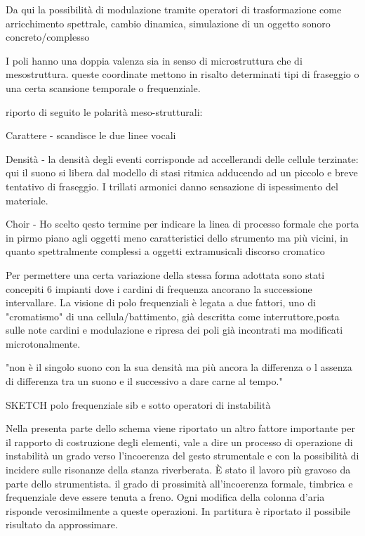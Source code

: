 Da qui la possibilità di modulazione tramite operatori di trasformazione come arricchimento spettrale, cambio dinamica, simulazione di un oggetto sonoro concreto/complesso

I poli hanno una doppia valenza sia in senso di microstruttura che di mesostruttura.
queste coordinate  mettono in risalto determinati tipi di fraseggio o una certa scansione temporale o frequenziale.

riporto di seguito le polarità meso-strutturali:

Carattere - scandisce le due linee vocali

Densità - la densità degli eventi corrisponde ad accellerandi delle cellule terzinate: qui il suono si libera dal modello di stasi ritmica adducendo ad un piccolo e breve tentativo di fraseggio. I trillati armonici danno sensazione di ispessimento del materiale.

Choir - Ho scelto qesto termine per indicare la linea di processo formale che porta in pirmo piano agli oggetti meno caratteristici dello strumento ma più vicini, in quanto spettralmente complessi a oggetti extramusicali
discorso cromatico


Per permettere una certa variazione della stessa forma adottata sono stati concepiti 6 impianti dove i cardini di frequenza ancorano la successione intervallare.
La visione di polo frequenziali è legata a due  fattori, uno di "cromatismo" di una cellula/battimento, già descritta come interruttore,posta sulle note cardini e modulazione e ripresa dei poli già incontrati ma modificati microtonalmente.

"non è il singolo suono con la sua densità ma più ancora la differenza o l assenza di differenza tra un suono e il successivo
a dare carne al tempo."


SKETCH polo frequenziale sib e sotto operatori di instabilità




Nella presenta parte dello schema viene riportato un altro fattore importante per il rapporto di costruzione degli elementi, vale a dire un processo di operazione di instabilità
un grado verso l'incoerenza del gesto strumentale e con la possibilità di incidere  sulle risonanze della stanza riverberata.
È stato il lavoro più gravoso da parte dello strumentista. il grado di prossimità all'incoerenza formale, timbrica e frequenziale deve essere tenuta a freno.
Ogni modifica della colonna d'aria risponde verosimilmente a queste operazioni. In partitura è riportato il possibile risultato da approssimare.







